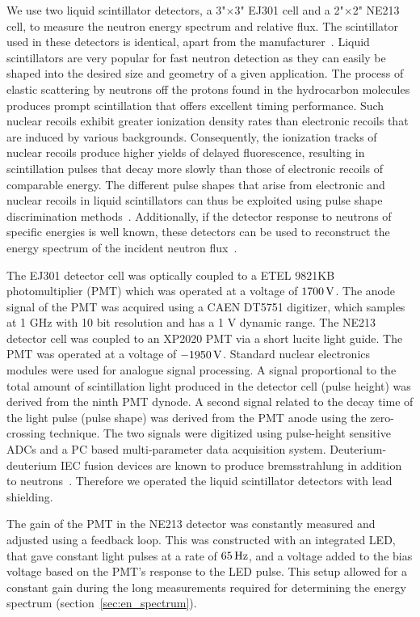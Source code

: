 We use two liquid scintillator detectors, a 3"$ \times$3" EJ301 cell and a 2"$\times$2" NE213 cell, to measure the neutron energy spectrum and relative flux. The scintillator used in these detectors is identical, apart from the manufacturer~\cite{ej_datasheet}. Liquid scintillators are very popular for fast neutron detection as they can easily be shaped into the desired size and geometry of a given application. The process of elastic scattering by neutrons off the protons found in the hydrocarbon molecules produces prompt scintillation that offers excellent timing performance. Such nuclear recoils exhibit greater ionization density rates than electronic recoils that are induced by various backgrounds. Consequently, the ionization tracks of nuclear recoils produce higher yields of delayed fluorescence, resulting in scintillation pulses that decay more slowly than those of electronic recoils of comparable energy. The different pulse shapes that arise from electronic and nuclear recoils in liquid scintillators can thus be exploited using pulse shape discrimination methods~\cite{Brooks:1959,Kuchnir:1968,Perkins:1979,Lang:2016xks}. Additionally, if the detector response to neutrons of specific energies is well known, these detectors can be used to reconstruct the energy spectrum of the incident neutron flux~\cite{Klein:2002,Verbinski:1968}.

The EJ301 detector cell was optically coupled to a ETEL 9821KB photomultiplier (PMT) which was operated at a voltage of $1700\,\mathrm{V}$. The anode signal of the PMT was acquired using a CAEN DT5751 digitizer, which samples at 1 GHz with 10 bit resolution and has a 1 V dynamic range. The NE213 detector cell was coupled to an XP2020 PMT via a short lucite light guide. The PMT was operated at a voltage of $-1950\,\mathrm{V}$. Standard nuclear electronics modules were used for analogue signal processing. A signal proportional to the total amount of scintillation light produced in the detector cell (pulse height) was derived from the ninth PMT dynode. A second signal related to the decay time of the light pulse (pulse shape) was derived from the PMT anode using the zero-crossing technique. The two signals were digitized using pulse-height sensitive ADCs and a PC based multi-parameter data acquisition system. Deuterium-deuterium IEC fusion devices are known to produce bremsstrahlung in addition to neutrons~\cite{Luo:2010}. Therefore we operated the liquid scintillator detectors with lead shielding.

The gain of the PMT in the NE213 detector was constantly measured and adjusted using a feedback loop. This was constructed with an integrated LED, that gave constant light pulses at a rate of $65\,\mathrm{Hz}$, and a voltage added to the bias voltage based on the PMT's response to the LED pulse. This setup allowed for a constant gain during the long measurements required for determining the energy spectrum (section~\ref{sec:en_spectrum}).

